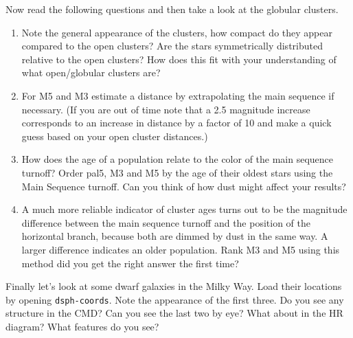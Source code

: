 \documentclass[12pt]{article}
\begin{document}
\noindent Now read the following questions and then take a look at the globular clusters. 
\begin{enumerate}
\item Note the general appearance of the clusters, how compact do they appear compared to the open clusters? Are the stars symmetrically distributed relative to the open clusters? How does this fit with your understanding of what open/globular clusters are?
\item For M5 and M3 estimate a distance by extrapolating the main sequence if necessary. (If you are out of time note that a 2.5 magnitude increase corresponds to an increase in distance by a factor of 10 and make a quick guess based on your open cluster distances.)
\item How does the age of a population relate to the color of the main sequence turnoff? Order pal5, M3 and M5 by the age of their oldest stars using the Main Sequence turnoff. Can you think of how dust might affect your results? 
\item A much more reliable indicator of cluster ages turns out to be the magnitude difference between the main sequence turnoff and the position of the horizontal branch, because both are dimmed by dust in the same way. A larger difference indicates an older population. Rank M3 and M5 using this method did you get the right answer the first time?     
\end{enumerate}

\noindent Finally let's look at some dwarf galaxies in the Milky Way.  Load their locations by opening \texttt{dsph-coords}. Note the appearance of the first three. Do you see any structure in the CMD? Can you see the last two by eye? What about in the HR diagram? What features do you see?
\end{document}
